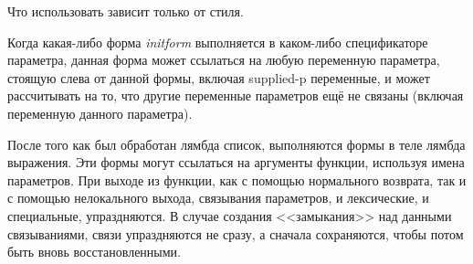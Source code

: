 Что использовать зависит только от стиля.

Когда какая-либо форма \emph{initform} выполняется в каком-либо спецификаторе
параметра, данная форма может ссылаться на любую переменную параметра, стоящую
слева от данной формы, включая supplied-p переменные, и может рассчитывать на
то, что другие переменные параметров ещё не связаны (включая переменную данного
параметра).

После того как был обработан лямбда список, выполняются формы в теле лямбда
выражения. Эти формы могут ссылаться на аргументы функции, используя имена
параметров. При выходе из функции, как с помощью нормального возврата, так и с
помощью нелокального выхода, связывания параметров, и лексические, и
специальные, упраздняются. В случае создания <<замыкания>> над данными
связываниями, связи упраздняются не сразу, а сначала сохраняются, чтобы
потом быть вновь восстановленными.

